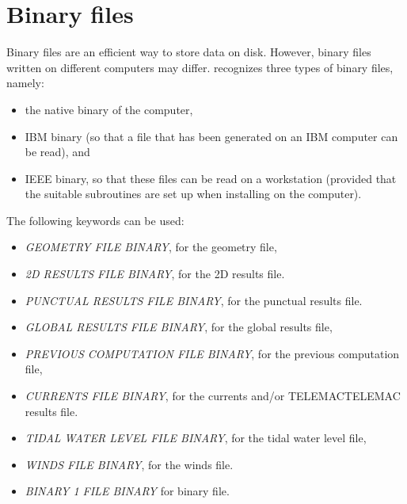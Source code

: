 \section{ Binary files }

 Binary files are an efficient way to store data on disk. However, binary files written on different computers may differ. \tomawac recognizes three types of binary files, namely:

\begin{itemize}
\item  the native binary of the computer,

\item  IBM binary (so that a file that has been generated on an IBM computer can be read), and

\item  IEEE binary, so that these files can be read on a workstation (provided that the suitable subroutines are set up when installing \tomawac on the computer).
\end{itemize}

 The following keywords can be used:

\begin{itemize}
\item  \textit{GEOMETRY FILE BINARY}, for the geometry file,

\item  \textit{2D RESULTS FILE BINARY}, for the 2D results file.

\item  \textit{PUNCTUAL RESULTS FILE BINARY}, for the punctual results file.

\item  \textit{GLOBAL RESULTS FILE BINARY}, for the global results file,

\item  \textit{PREVIOUS COMPUTATION FILE BINARY}, for the previous computation file,

\item  \textit{CURRENTS FILE BINARY}, for the currents and/or TELEMACTELEMAC results file.

\item  \textit{TIDAL WATER LEVEL FILE BINARY}, for the tidal water level file,

\item  \textit{WINDS FILE BINARY}, for the winds file.

\item  \textit{BINARY 1 FILE BINARY }for binary file.
\end{itemize}


